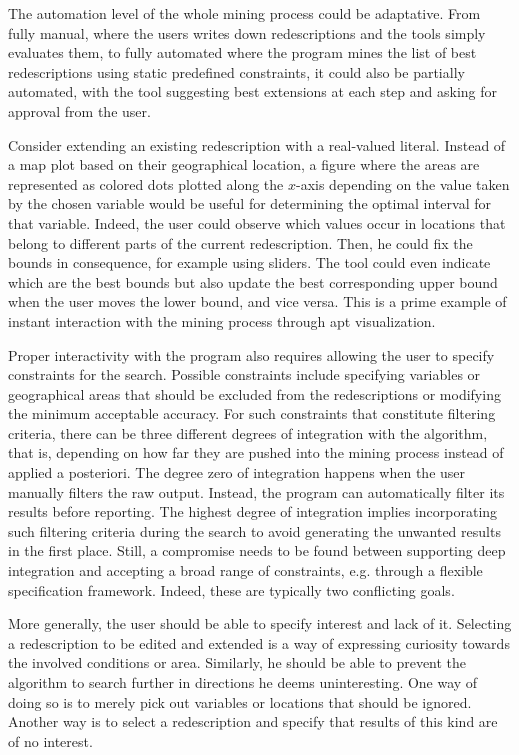 The automation level of the whole mining process could be adaptative.
From fully manual, where the users writes down redescriptions and the
tools simply evaluates them, to fully automated where the program
mines the list of best redescriptions using static predefined
constraints, it could also be partially automated, with the tool
suggesting best extensions at each step and asking for approval from
the user.

Consider extending an existing redescription with a real-valued
literal. Instead of a map plot based on their geographical location, a
figure where the areas are represented as colored dots plotted along
the $x$-axis depending on the value taken by the chosen variable would be
useful for determining the optimal interval for that variable. Indeed,
the user could observe which values occur in locations that belong to
different parts of the current redescription. Then, he could fix the
bounds in consequence, for example using sliders.  The tool could even
indicate which are the best bounds but also update the best
corresponding upper bound when the user moves the lower bound, and
vice versa. This is a prime example of instant interaction with the
mining process through apt visualization.  

Proper interactivity with the program also requires allowing the user
to specify constraints for the search. Possible constraints include
specifying variables or geographical areas that should be excluded
from the redescriptions or modifying the minimum acceptable accuracy.
For such constraints that constitute filtering criteria, there can be
three different degrees of integration with the algorithm, that is, depending on
how far they are pushed into the mining process instead of applied a
posteriori.  The degree zero of integration happens when the user
manually filters the raw output. Instead, the program can
automatically filter its results before reporting. The highest degree
of integration implies incorporating such filtering criteria during
the search to avoid generating the unwanted results in the first
place.  Still, a compromise needs to be found between supporting
deep integration and accepting a broad range of constraints,
e.g. through a flexible specification framework. Indeed, these are typically two
 conflicting goals.

 More generally, the user should be able to specify interest and lack
 of it. Selecting a redescription to be edited and extended is a way
 of expressing curiosity towards the involved conditions or
 area. Similarly, he should be able to prevent the algorithm to search
 further in directions he deems uninteresting.  One way of doing so is
 to merely pick out variables or locations that should be ignored.
 Another way is to select a redescription and specify that results of
 this kind are of no interest. 


